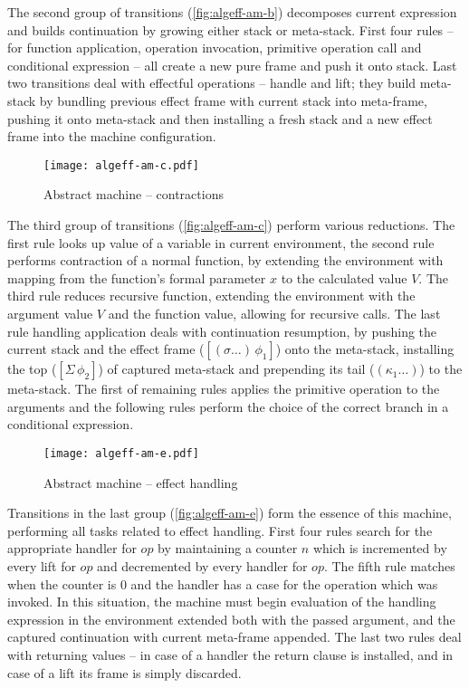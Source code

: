 \documentclass[inz, english, longabstract]{iithesis}
\begin{document}
The second group of transitions (\autoref{fig:algeff-am-b}) decomposes current expression and builds continuation by growing either stack or meta-stack.
First four rules -- for function application, operation invocation, primitive operation call and conditional expression -- all create a new pure frame and push it onto stack.
Last two transitions deal with effectful operations -- handle and lift; they build meta-stack by bundling previous effect frame with current stack into meta-frame, pushing it onto meta-stack and then installing a fresh stack and a new effect frame into the machine configuration.

\begin{figure}[t]
  \centering 
  \texttt{[image: algeff-am-c.pdf]}
  \caption{Abstract machine -- contractions}
  \label{fig:algeff-am-c}
\end{figure}

The third group of transitions (\autoref{fig:algeff-am-c}) perform various reductions.
The first rule looks up value of a variable in current environment, the second rule performs contraction of a normal function, by extending the environment with mapping from the function's formal parameter $ x $ to the calculated value $ V $.
The third rule reduces recursive function, extending the environment with the argument value $ V $ and the function value, allowing for recursive calls.
The last rule handling application deals with continuation resumption, by pushing the current stack and the effect frame ($ [(\sigma \ldots) \, \phi_1] $) onto the meta-stack, installing the top ($ [\Sigma \, \phi_2] $) of captured meta-stack and prepending its tail ($ (\kappa_1 \ldots) $) to the meta-stack.
The first of remaining rules applies the primitive operation to the arguments and the following rules perform the choice of the correct branch in a conditional expression.

\begin{figure}[t]
  \centering
  \texttt{[image: algeff-am-e.pdf]}
  \caption{Abstract machine -- effect handling}
  \label{fig:algeff-am-e}
\end{figure}

Transitions in the last group (\autoref{fig:algeff-am-e}) form the essence of this machine, performing all tasks related to effect handling.
First four rules search for the appropriate handler for $ op $ by maintaining a counter $ n $ which is incremented by every lift for $ op $ and decremented by every handler for $ op $.
The fifth rule matches when the counter is $ 0 $ and the handler has a case for the operation which was invoked. 
In this situation, the machine must begin evaluation of the handling expression in the environment extended both with the passed argument, and the captured continuation with current meta-frame appended.
The last two rules deal with returning values -- in case of a handler the return clause is installed, and in case of a lift its frame is simply discarded.
\end{document}
